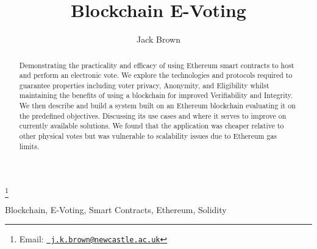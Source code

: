 \documentclass{entcs}
\begin{document}
\begin{frontmatter}

\title{Blockchain E-Voting}
\author{Jack Brown}
\address{School of Computing Science, Newcastle University, UK} 

\thanks{Email:
    \href{mailto:j.k.brown@newcastle.ac.uk} {\texttt{\normalshape
        j.k.brown@newcastle.ac.uk}}}

\begin{abstract} 
Demonstrating the practicality and efficacy of using Ethereum smart contracts to host and perform an electronic vote. We explore the technologies and protocols required to guarantee properties including voter privacy, Anonymity, and Eligibility whilst maintaining the benefits of using a blockchain for improved Verifiability and Integrity. We then describe and build a system built on an Ethereum blockchain evaluating it on the predefined objectives. Discussing its use cases and where it serves to improve on currently available solutions. We found that the application was cheaper relative to other physical votes but was vulnerable to scalability issues due to Ethereum gas limits.
\end{abstract}

\begin{keyword}
Blockchain, E-Voting, Smart Contracts, Ethereum, Solidity
\end{keyword}

\end{frontmatter}
\end{document}
